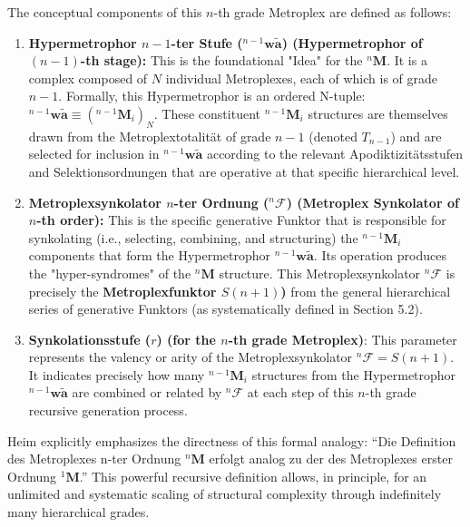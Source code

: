 \documentclass[12pt]{article}
\newcommand{\q}[1]{\enquote{#1}}
\newcommand{\metroplex}[1]{{}^{#1}\mathbf{M}}
\newcommand{\hypersyntrix}{\metroplex{1}}
\newcommand{\hypermetrophor}[1]{{}^{#1}\mathbf{w\widetilde{a}}}
\newcommand{\metroplexsynkolator}[1]{{}^{#1}\mathcal{F}}
\newcommand{\metroplextotalitaet}[1]{T_{#1}}
\newcommand{\metroplexfunktor}{S}
\begin{document}
\begin{itemize}
\begin{equation}
    \tag{24}
    \end{equation}
    The conceptual components of this \(n\)-th grade Metroplex are defined as follows:
    \begin{enumerate}
        \item \textbf{Hypermetrophor \( n-1 \)-ter Stufe (\( \hypermetrophor{n-1} \)) (Hypermetrophor of \( (n-1) \)-th stage):} This is the foundational "Idea" for the \( \metroplex{n} \). It is a complex composed of \( N \) individual Metroplexes, each of which is of grade \( n-1 \). Formally, this Hypermetrophor is an ordered N-tuple: \( \hypermetrophor{n-1} \equiv (\metroplex{n-1}_i)_N \). These constituent \( \metroplex{n-1}_i \) structures are themselves drawn from the Metroplextotalität of grade \( n-1 \) (denoted \( \metroplextotalitaet{n-1} \)) and are selected for inclusion in \( \hypermetrophor{n-1} \) according to the relevant Apodiktizitätsstufen and Selektionsordnungen that are operative at that specific hierarchical level.
        \item \textbf{Metroplexsynkolator \( n \)-ter Ordnung (\( \metroplexsynkolator{n} \)) (Metroplex Synkolator of \( n \)-th order):} This is the specific generative Funktor that is responsible for synkolating (i.e., selecting, combining, and structuring) the \( \metroplex{n-1}_i \) components that form the Hypermetrophor \( \hypermetrophor{n-1} \). Its operation produces the "hyper-syndromes" of the \( \metroplex{n} \) structure. This Metroplexsynkolator \( \metroplexsynkolator{n} \) is precisely the \textbf{Metroplexfunktor \( \metroplexfunktor(n+1) \))} from the general hierarchical series of generative Funktors (as systematically defined in Section 5.2).
        \item \textbf{Synkolationsstufe (\( r \)) (for the \(n\)-th grade Metroplex)}: This parameter represents the valency or arity of the Metroplexsynkolator \( \metroplexsynkolator{n} = \metroplexfunktor(n+1) \). It indicates precisely how many \( \metroplex{n-1}_i \) structures from the Hypermetrophor \( \hypermetrophor{n-1} \) are combined or related by \( \metroplexsynkolator{n} \) at each step of this \( n \)-th grade recursive generation process.
    \end{enumerate}
    Heim explicitly emphasizes the directness of this formal analogy: \q{Die Definition des Metroplexes n-ter Ordnung \( \metroplex{n} \) erfolgt analog zu der des Metroplexes erster Ordnung \( \hypersyntrix \).} This powerful recursive definition allows, in principle, for an unlimited and systematic scaling of structural complexity through indefinitely many hierarchical grades.


\end{itemize}
\end{document}
